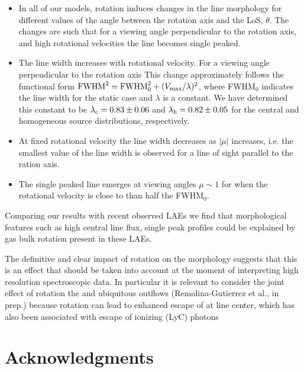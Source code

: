 \documentclass{emulateapj}
\newcommand{\ly}{{\ifmmode{{\rm Ly}\alpha~}\else{Ly$\alpha$~}\fi}}
\begin{document}
\begin{itemize}

\item In all of our models, rotation induces changes in the line morphology
 for different values of the angle between the rotation
 axis and the LoS, $\theta$.  The changes are such that for 
 a viewing angle perpendicular to the
 rotation axis, and high rotational velocities the line becomes single peaked.

\item The line width increases with rotational
  velocity. For a viewing angle perpendicular to the rotation axis
  This change approximately follows the functional form  ${\rm FWHM}^2
  = {\rm FWHM}_{ 0}^2 + (V_{\rm max}/\lambda)^2$, where FWHM$_{0}$
  indicates the line 
  width for the static case and $\lambda$ is a constant. We have
  determined this constant to be  $\lambda_{\rm c}=0.83 \pm 0.06$ and
  $\lambda_{\rm h}=0.82\pm 0.05$ for the central and homogeneous source
  distributions, respectively.

\item At fixed rotational velocity the line width decreases as $|\mu|$
  increases, i.e. the smallest value of the line width is observed for
  a line of sight parallel to the ration axis. 

\item The single peaked line emerges at viewing angles $\mu\sim 1$ for
  when the rotational velocity is close to than half the FWHM$_0$.
\end{itemize}

Comparing our results with recent observed LAEs we find that 
morphological features such as high central line flux, single peak
profiles  could be explained by gas bulk  rotation present in these
LAEs. 

The definitive and clear impact of rotation on the \ly morphology
suggests that this is an effect that should be taken into account at
the moment of interpreting high resolution spectroscopic data. In
particular it is relevant to consider the joint effect of rotation the
and ubiquitous outflows (Remolina-Gutierrez et al., in prep.)
because rotation can lead to enhanced escape of \ly at line center, which
has also been associated with escape of ionizing (LyC) photons
\citep{Behrens2014,2014arXiv1404.2958V}


\section*{Acknowledgments}
\end{document}

